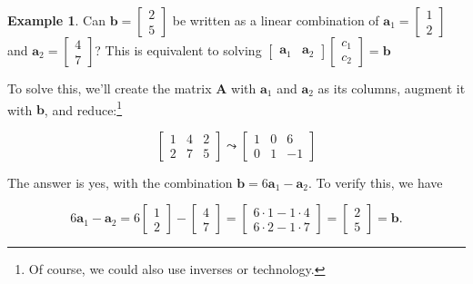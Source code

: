\documentclass[
]{book}
\theoremstyle{definition}
\theoremstyle{definition}
\newtheorem{example}{Example}[chapter]
\theoremstyle{definition}
\theoremstyle{definition}
\theoremstyle{remark}
\begin{document}
\begin{examplebox}

\begin{example}
Can \(\mathbf{b}=\begin{bmatrix}2\\5\end{bmatrix}\) be written as a linear combination of \(\mathbf{a}_1=\begin{bmatrix}1\\2\end{bmatrix}\) and \(\mathbf{a}_2=\begin{bmatrix}4\\7\end{bmatrix}\)? This is equivalent to solving \(\begin{bmatrix}\mathbf{a}_1 & \mathbf{a}_2\end{bmatrix}\begin{bmatrix}c_1\\c_2\end{bmatrix}=\mathbf{b}\)

To solve this, we'll create the matrix \(\mathbf{A}\) with \(\mathbf{a}_1\) and \(\mathbf{a}_2\) as its columns, augment it with \(\mathbf{b}\), and reduce:\footnote{Of course, we could also use inverses or technology.}

\[\left[ \begin{array}{ll|l} 1 & 4 & 2\\2 & 7 & 5\end{array}\right]\leadsto \left[ \begin{array}{ll|l} 1 & 0 & 6\\0 & 1 & -1\end{array}\right]\]

The answer is yes, with the combination \(\mathbf{b}=6\mathbf{a}_1-\mathbf{a}_2\). To verify this, we have

\[6\mathbf{a}_1-\mathbf{a}_2=6\begin{bmatrix}1\\2\end{bmatrix}-\begin{bmatrix}4\\7\end{bmatrix}=\begin{bmatrix}6\cdot 1-1\cdot 4\\6\cdot 2-1\cdot 7\end{bmatrix}=\begin{bmatrix}2\\5\end{bmatrix}=\mathbf{b}.\]
\end{example}

\end{examplebox}
\end{document}
